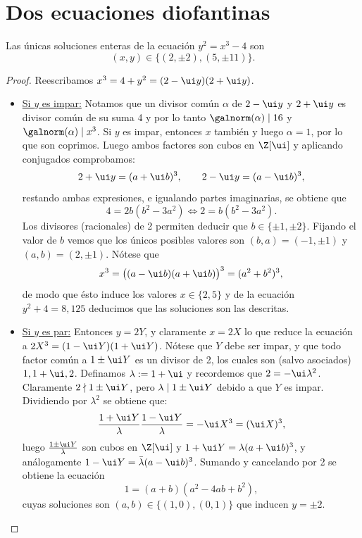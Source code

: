 \documentclass[11pt, reqno]{amsart}
\begin{document}
\section{Dos ecuaciones diofantinas}
\begin{thm}
	Las únicas soluciones enteras de la ecuación $y^2 = x^3 - 4$ son
	$$ (x, y) \in \{ (2, \pm 2), (5, \pm 11) \}. $$
\end{thm}
\begin{proof}
	Reescribamos $x^3 = 4 + y^2 = (2 - \ui y)(2 + \ui y)$.
	\begin{itemize}
		\item \underline{Si $y$ es impar:}
			Notamos que un divisor común $\alpha$ de $2 - \ui y$ y $2 + \ui y$ es divisor común de su suma 4
			y por lo tanto $\galnorm(\alpha) \mid 16$ y $\galnorm(\alpha) \mid x^3$.
			Si $y$ es impar, entonces $x$ también y luego $\alpha = 1$, por lo que son coprimos.
			Luego ambos factores son cubos en $\Z[\ui]$ y aplicando conjugados comprobamos:
			$$ 2 + \ui y = (a + \ui b)^3, \qquad 2 - \ui y = (a - \ui b)^3, $$
			restando ambas expresiones, e igualando partes imaginarias, se obtiene que
			$$ 4 = 2b(b^2 - 3a^2) \iff 2 = b(b^2 - 3a^2). $$
			Los divisores (racionales) de 2 permiten deducir que $b \in \{ \pm 1, \pm 2 \}$.
			Fijando el valor de $b$ vemos que los únicos posibles valores son $(b, a) = (-1, \pm 1)$ y $(a, b) = (2, \pm 1)$.
			Nótese que
			$$ x^3 = \big( (a - \ui b)(a + \ui b) \big)^3 = (a^2 + b^2)^3, $$
			de modo que ésto induce los valores $x \in \{ 2, 5 \}$ y de la ecuación $y^2 + 4 = 8, 125$ deducimos que
			las soluciones son las descritas.

		\item \underline{Si $y$ es par:}
			Entonces $y = 2Y$, y claramente $x = 2X$ lo que reduce la ecuación a $2X^3 = (1 - \ui Y)(1 + \ui Y)$.
			Nótese que $Y$ debe ser impar, y que todo factor común a $1 \pm \ui Y$ es un divisor de 2, los cuales son (salvo asociados)
			$1, 1 + \ui, 2$.
			Definamos $\lambda := 1 + \ui$ y recordemos que $2 = -\ui \lambda^2$.
			Claramente $2 \nmid 1 \pm \ui Y$, pero $\lambda \mid 1 \pm \ui Y$ debido a que $Y$ es impar.
			Dividiendo por $\lambda^2$ se obtiene que:
			$$ \frac{1 + \ui Y}{\lambda} \frac{1 - \ui Y}{\lambda} = -\ui X^3 = (\ui X)^3, $$
			luego $\frac{1 \pm \ui Y}{\lambda}$ son cubos en $\Z[\ui]$ y $1 + \ui Y = \lambda(a + \ui b)^3$, y análogamente
			$1 - \ui Y = \bar\lambda (a - \ui b)^3$.
			Sumando y cancelando por 2 se obtiene la ecuación
			$$ 1 = (a + b)(a^2 - 4ab + b^2), $$
			cuyas soluciones son $(a, b) \in \{ (1, 0), (0, 1) \}$ que inducen $y = \pm 2$. \qedhere
	\end{itemize}
\end{proof}
\end{document}
